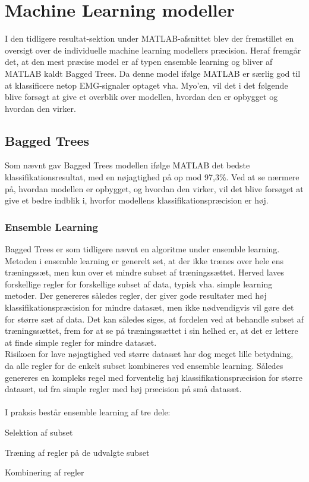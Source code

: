 \thispagestyle{fancy}

\chapter{Machine Learning modeller}
\label{chp:mlm}
I den tidligere resultat-sektion under MATLAB-afsnittet blev der fremstillet en oversigt over de individuelle machine learning modellers præcision. Heraf fremgår det, at den mest præcise model er af typen ensemble learning og bliver af MATLAB kaldt Bagged Trees. Da denne model ifølge MATLAB er særlig god til at klassificere netop EMG-signaler optaget vha. Myo'en, vil det i det følgende blive forsøgt at give et overblik over modellen, hvordan den er opbygget og hvordan den virker. 

\section{Bagged Trees}
\label{sec:baggedTrees}
Som nævnt gav Bagged Trees modellen ifølge MATLAB det bedste klassifikationsresultat, med en nøjagtighed på op mod 97,3\%. Ved at se nærmere på, hvordan modellen er opbygget, og hvordan den virker, vil det blive forsøget at give et bedre indblik i, hvorfor modellens klassifikationspræcision er høj. 

\subsection{Ensemble Learning}
Bagged Trees er som tidligere nævnt en algoritme under ensemble learning. Metoden i ensemble learning er generelt set, at der ikke trænes over hele ens træningssæt, men kun over et mindre subset af træningssættet. Herved laves forskellige regler for forskellige subset af data, typisk vha. simple learning metoder. Der genereres således regler, der giver gode resultater med høj klassifikationspræcision for mindre datasæt, men ikke nødvendigvis vil gøre det for større sæt af data. 
Det kan således siges, at fordelen ved at behandle subset af træningssættet, frem for at se på træningssættet i sin helhed er, at det er lettere at finde simple regler for mindre datasæt.
\\Risikoen for lave nøjagtighed ved større datasæt har dog meget lille betydning, da alle regler for de enkelt subset kombineres ved ensemble learning. Således genereres en kompleks regel med forventelig høj klassifikationspræcision for større datasæt, ud fra simple regler med høj præcision på små datasæt\citep{ensemble}.
\\\\
I praksis består ensemble learning af tre dele:
\begin{myEnumerate}
\item Selektion af subset
\item Træning af regler på de udvalgte subset
\item Kombinering af regler 
\end{myEnumerate}

